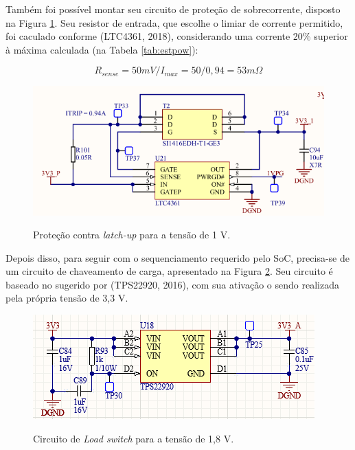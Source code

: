 Também foi possível montar seu circuito de proteção de sobrecorrente, disposto na Figura \ref{fig:1vocp}. Seu resistor de entrada, que escolhe o limiar de corrente permitido, foi caculado conforme (LTC4361, 2018), considerando uma corrente 20\% superior à máxima calculada (na Tabela \ref{tab:estpow}):

\begin{equation}
	R_{sense} = 50 mV / I_{max} =50 / 0,94 = 53 m\Omega
\end{equation} 

\begin{figure}[H]
    \centering
    \caption{Proteção contra \textit{latch-up} para a tensão de 1 V.}
    \includegraphics[scale=1]{images/1vocp.png}
    \label{fig:1vocp}
\end{figure}

Depois disso, para seguir com o sequenciamento requerido pelo SoC, precisa-se de um circuito de chaveamento de carga, apresentado na Figura \ref{fig:sw1}. Seu circuito é baseado no sugerido por (TPS22920, 2016), com sua ativação o sendo realizada pela própria tensão de 3,3 V.

\begin{figure}[H]
    \centering
    \caption{Circuito de \textit{Load switch} para a tensão de 1,8 V.}
    \includegraphics[scale=1]{images/sw1.png}
    \label{fig:sw1}
\end{figure}

